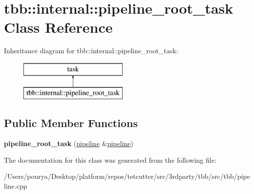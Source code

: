 \hypertarget{classtbb_1_1internal_1_1pipeline__root__task}{}\section{tbb\+:\+:internal\+:\+:pipeline\+\_\+root\+\_\+task Class Reference}
\label{classtbb_1_1internal_1_1pipeline__root__task}
Inheritance diagram for tbb\+:\+:internal\+:\+:pipeline\+\_\+root\+\_\+task\+:\begin{figure}[H]
\begin{center}
\leavevmode
\includegraphics[height=2.000000cm]{classtbb_1_1internal_1_1pipeline__root__task}
\end{center}
\end{figure}
\subsection*{Public Member Functions}
\begin{DoxyCompactItemize}
\item 
\hypertarget{classtbb_1_1internal_1_1pipeline__root__task_abe35c6b57f063e84eb119b9b4c21eaa0}{}{\bfseries pipeline\+\_\+root\+\_\+task} (\hyperlink{classtbb_1_1pipeline}{pipeline} \&\hyperlink{classtbb_1_1pipeline}{pipeline})\label{classtbb_1_1internal_1_1pipeline__root__task_abe35c6b57f063e84eb119b9b4c21eaa0}

\end{DoxyCompactItemize}


The documentation for this class was generated from the following file\+:\begin{DoxyCompactItemize}
\item 
/\+Users/pourya/\+Desktop/platform/repos/tetcutter/src/3rdparty/tbb/src/tbb/pipeline.\+cpp\end{DoxyCompactItemize}
